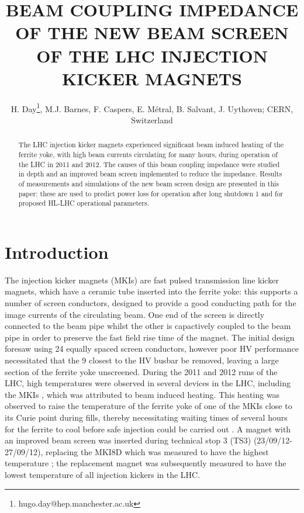 \documentclass[a4paper,
              ]{jacow}
\begin{document}
\title{BEAM COUPLING IMPEDANCE OF THE NEW BEAM SCREEN OF THE LHC INJECTION KICKER MAGNETS}
\author{H. Day\thanks{hugo.day@hep.manchester.ac.uk}, M.J. Barnes, F. Caspers, E. Métral, B. Salvant, J. Uythoven;  CERN, Switzerland}

\maketitle 


\begin{abstract}
The LHC injection kicker magnets experienced significant beam induced heating of the ferrite yoke, with high beam currents circulating for many hours, during operation of the LHC in 2011 and 2012. The causes of this beam coupling impedance were studied in depth and an improved beam screen implemented to reduce the impedance. Results of measurements and simulations of the new beam screen design are presented in this paper: these are used to predict power loss for operation after long shutdown 1 and for proposed HL-LHC operational parameters.
\end{abstract}

\section{Introduction}

The injection kicker magnets (MKIs) are fast pulsed transmission line kicker magnets, which have a ceramic tube inserted into the ferrite yoke: this supports a number of screen conductors, designed to provide a good conducting path for the image currents of the circulating beam. One end of the screen is directly connected to the beam pipe whilst the other is capactively coupled to the beam pipe in order to preserve the fast field rise time of the magnet. The initial design foresaw using 24 equally spaced screen conductors, however poor HV performance necessitated that the 9 closest to the HV busbar be removed, leaving a large section of the ferrite yoke unscreened. During the 2011 and 2012 runs of the LHC, high temperatures were observed in several devices in the LHC, including the MKIs \cite{mki-heating}, which was attributed to beam induced heating. This heating was observed to raise the temperature of the ferrite yoke of one of the MKIs close to its Curie point during fills, thereby necessitating waiting times of several hours for the ferrite to cool before safe injection could be carried out \cite{mki-heating}. A magnet with an improved beam screen was inserted during technical stop 3 (TS3) (23/09/12-27/09/12), replacing the MKI8D which was measured to have the highest temperature \cite{mki-heatingTemp}; the replacement magnet was subsequently measured to have the lowest temperature of all injection kickers in the LHC.
\end{document}
